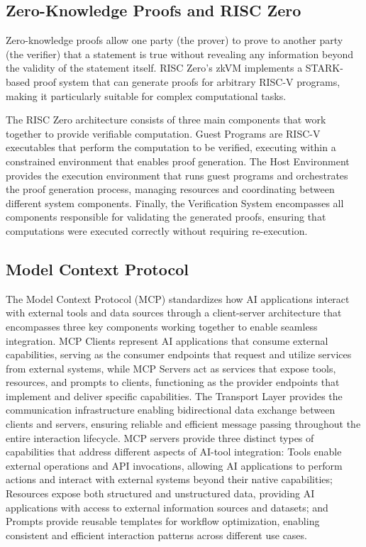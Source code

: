 \documentclass[11pt]{article}
\begin{document}
\subsection{Zero-Knowledge Proofs and RISC Zero}

Zero-knowledge proofs allow one party (the prover) to prove to another party (the verifier) that a statement is true without revealing any information beyond the validity of the statement itself. RISC Zero's zkVM implements a STARK-based proof system that can generate proofs for arbitrary RISC-V programs, making it particularly suitable for complex computational tasks.

The RISC Zero architecture consists of three main components that work together to provide verifiable computation. Guest Programs are RISC-V executables that perform the computation to be verified, executing within a constrained environment that enables proof generation. The Host Environment provides the execution environment that runs guest programs and orchestrates the proof generation process, managing resources and coordinating between different system components. Finally, the Verification System encompasses all components responsible for validating the generated proofs, ensuring that computations were executed correctly without requiring re-execution.

\subsection{Model Context Protocol}

The Model Context Protocol (MCP) standardizes how AI applications interact with external tools and data sources through a client-server architecture that encompasses three key components working together to enable seamless integration. MCP Clients represent AI applications that consume external capabilities, serving as the consumer endpoints that request and utilize services from external systems, while MCP Servers act as services that expose tools, resources, and prompts to clients, functioning as the provider endpoints that implement and deliver specific capabilities. The Transport Layer provides the communication infrastructure enabling bidirectional data exchange between clients and servers, ensuring reliable and efficient message passing throughout the entire interaction lifecycle. MCP servers provide three distinct types of capabilities that address different aspects of AI-tool integration: Tools enable external operations and API invocations, allowing AI applications to perform actions and interact with external systems beyond their native capabilities; Resources expose both structured and unstructured data, providing AI applications with access to external information sources and datasets; and Prompts provide reusable templates for workflow optimization, enabling consistent and efficient interaction patterns across different use cases.
\end{document}
